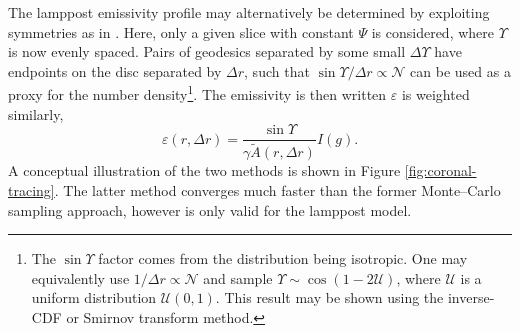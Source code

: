 \documentclass[fleqn,usenatbib]{mnras}
\begin{document}
The lamppost emissivity profile may alternatively
be determined by exploiting symmetries as in \cite{dauser_irradiation_2013}.
Here, only a given slice with constant $\Psi$ is considered, where $\Upsilon$ is
now evenly spaced. Pairs of geodesics separated by some small $\Delta \Upsilon$
have endpoints on the disc separated by $\Delta r$, such that $\sin \Upsilon
/ \Delta r \propto \mathcal{N}$ can be used as a proxy for the number
density\footnote{The $\sin \Upsilon$ factor comes from the distribution being
    isotropic. One may equivalently use $1/\Delta r \propto \mathcal{N}$ and
    sample $\Upsilon \sim \cos (1 - 2 \mathcal{U})$, where $\mathcal{U}$ is a
    uniform distribution $\mathcal{U}(0,1)$. This result may be shown using the
    inverse-CDF or Smirnov transform method.}. The emissivity is then written
$\varepsilon$ is weighted similarly,\begin{equation}
    \varepsilon(r, \Delta r) = \frac{\sin \Upsilon}{\gamma \tilde{A}(r, \Delta r)} I(g).
\end{equation}
A conceptual illustration of the two methods is shown in Figure
\ref{fig:coronal-tracing}. The latter method converges much faster than the
former Monte--Carlo sampling approach, however is only valid for the lamppost
model.
\end{document}
